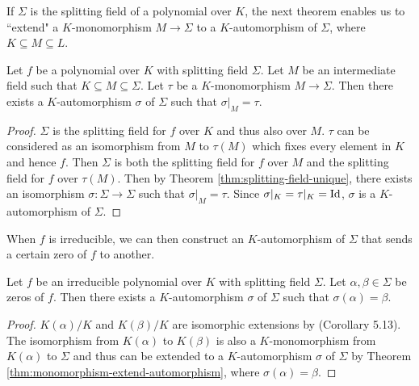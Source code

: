 If $\Sigma$ is the splitting field of a polynomial over $K$, the next theorem enables us to ``extend" a $K$-monomorphism $M \to \Sigma$ to a $K$-automorphism of $\Sigma$, where $K \subseteq M \subseteq L$. 

\begin{theorem} \label{thm:monomorphism-extend-automorphism}
	Let $f$ be a polynomial over $K$ with splitting field $\Sigma$. Let $M$ be an intermediate field such that $K \subseteq M \subseteq \Sigma$. Let $\tau$ be a $K$-monomorphism $M \to \Sigma$. Then there exists a $K$-automorphism $\sigma$ of $\Sigma$ such that $\sigma | _M = \tau$.  
\end{theorem}

\begin{proof}
	$\Sigma$ is the splitting field for $f$ over $K$ and thus also over $M$. $\tau$ can be considered as an isomorphism from $M$ to $\tau(M)$ which fixes every element in $K$ and hence $f$. Then $\Sigma$ is both the splitting field for $f$ over $M$ and the splitting field for $f$ over $\tau(M)$. Then by Theorem \ref{thm:splitting-field-unique}, there exists an isomorphism $\sigma: \Sigma \to \Sigma$ such that $\sigma | _M = \tau$. Since $\sigma | _K = \tau |_K = \operatorname{Id}$, $\sigma$ is a $K$-automorphism of $\Sigma$. 
\end{proof}

When $f$ is irreducible, we can then construct an $K$-automorphism of $\Sigma$ that sends a certain zero of $f$ to another.

\begin{theorem} \label{thm:automorphism-from-zeros}
	Let $f$ be an irreducible polynomial over $K$ with splitting field $\Sigma$. Let $\alpha, \beta \in \Sigma$ be zeros of $f$. Then there exists a $K$-automorphism $\sigma$ of $\Sigma$ such that $\sigma(\alpha) = \beta$. 
\end{theorem}

\begin{proof}
	$K(\alpha)/K$ and $K(\beta)/K$ are isomorphic extensions by \TODO(Corollary 5.13). The isomorphism from $K(\alpha)$ to $K(\beta)$ is also a $K$-monomorphism from $K(\alpha)$ to $\Sigma$ and thus can be extended to a $K$-automorphism $\sigma$ of $\Sigma$ by Theorem \ref{thm:monomorphism-extend-automorphism}, where $\sigma(\alpha) = \beta$.
\end{proof}


